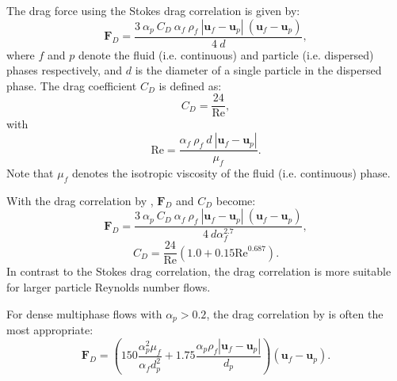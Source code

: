 The drag force using the Stokes drag correlation is given by:
\begin{equation}\label{eq:stokes_drag_force}
\mathbf{F}_D = \frac{3\ \alpha_p\ C_D\ \alpha_f\ \rho_f\ |\mathbf{u}_f-\mathbf{u}_p|\ (\mathbf{u}_f-\mathbf{u}_p)}{4\ d},
\end{equation}
where $f$ and $p$ denote the fluid (i.e. continuous) and particle (i.e. dispersed) phases respectively, and $d$ is the diameter of a single particle in the dispersed phase. The drag coefficient $C_D$ is defined as:
\begin{equation}\label{eq:stokes_drag_coefficient}
C_D = \frac{24}{\mathrm{Re}},
\end{equation}
with
\begin{equation}\label{eq:particle_reynolds_number}
\mathrm{Re} = \frac{\alpha_f\ \rho_f\ d\ |\mathbf{u}_f-\mathbf{u}_p|}{\mu_f}.
\end{equation}
Note that $\mu_f$ denotes the isotropic viscosity of the fluid (i.e. continuous) phase.

With the drag correlation by \cite{wen_yu_1966}, $\mathbf{F}_D$ and $C_D$ become:
\begin{equation}\label{eq:wen_yu_drag_force}
\mathbf{F}_D = \frac{3\ \alpha_p\ C_D\ \alpha_f\ \rho_f\ |\mathbf{u}_f-\mathbf{u}_p|\ (\mathbf{u}_f-\mathbf{u}_p)}{4\ d\alpha_f^{2.7}},
\end{equation}
\begin{equation}\label{eq:wen_yu_drag_coefficient}
C_D = \frac{24}{\mathrm{Re}}\left(1.0 + 0.15\mathrm{Re}^{0.687}\right).
\end{equation}
In contrast to the Stokes drag correlation, the \cite{wen_yu_1966} drag correlation is more suitable for larger particle Reynolds number flows. 

For dense multiphase flows with $\alpha_p > 0.2$, the drag correlation by \cite{ergun1952} is often the most appropriate:
\begin{equation}\label{eq:ergun_drag_force}
\mathbf{F}_D = \left(150\frac{\alpha_p^2\mu_f}{\alpha_f d_p^2} + 1.75\frac{\alpha_p\rho_f|\mathbf{u}_f-\mathbf{u}_p|}{d_p}\right)\left(\mathbf{u}_f-\mathbf{u}_p\right).
\end{equation}

